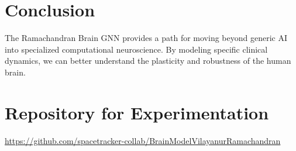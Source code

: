 \documentclass[12pt]{article}
\begin{document}
\section{Conclusion}
The Ramachandran Brain GNN provides a path for moving beyond generic AI into specialized computational neuroscience. By modeling specific clinical dynamics, we can better understand the plasticity and robustness of the human brain.

\section{Repository for Experimentation}
\noindent
\url{https://github.com/spacetracker-collab/BrainModelVilayanurRamachandran}
\end{document}
